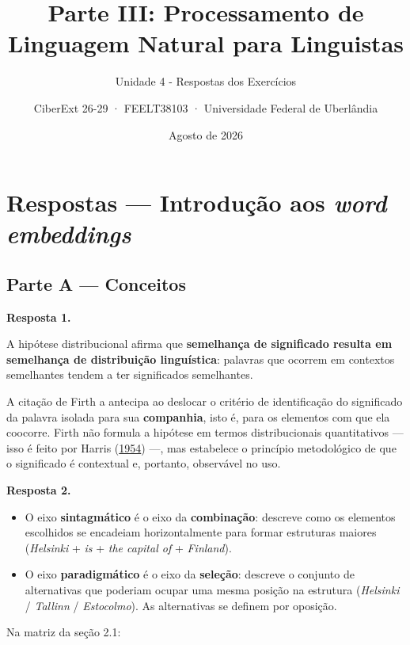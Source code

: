 \documentclass[
  brazilian,
]{article}
\title{Parte III: Processamento de Linguagem Natural para Linguistas}
\subtitle{Unidade 4 - Respostas dos Exercícios}
\author{CiberExt 26-29 · FEELT38103 · Universidade Federal de
Uberlândia}
\date{Agosto de 2026}
\providecommand{\tightlist}{%
  \setlength{\itemsep}{0pt}\setlength{\parskip}{0pt}}
\begin{document}
\maketitle

\hypertarget{respostas-introduuxe7uxe3o-aos-word-embeddings}{%
\section{\texorpdfstring{Respostas --- Introdução aos \emph{word
embeddings}}{Respostas --- Introdução aos word embeddings}}\label{respostas-introduuxe7uxe3o-aos-word-embeddings}}

\hypertarget{parte-a-conceitos}{%
\subsection{Parte A --- Conceitos}\label{parte-a-conceitos}}

\textbf{Resposta 1.}

A hipótese distribucional afirma que \textbf{semelhança de significado
resulta em semelhança de distribuição linguística}: palavras que ocorrem
em contextos semelhantes tendem a ter significados semelhantes.

A citação de Firth a antecipa ao deslocar o critério de identificação do
significado da palavra isolada para sua \textbf{companhia}, isto é, para
os elementos com que ela coocorre. Firth não formula a hipótese em
termos distribucionais quantitativos --- isso é feito por Harris
(\href{https://doi.org/10.1080/00437956.1954.11659520}{1954}) ---, mas
estabelece o princípio metodológico de que o significado é contextual e,
portanto, observável no uso.

\textbf{Resposta 2.}

\begin{itemize}
\tightlist
\item
  O eixo \textbf{sintagmático} é o eixo da \textbf{combinação}: descreve
  como os elementos escolhidos se encadeiam horizontalmente para formar
  estruturas maiores (\emph{Helsinki} + \emph{is} + \emph{the capital
  of} + \emph{Finland}).
\item
  O eixo \textbf{paradigmático} é o eixo da \textbf{seleção}: descreve o
  conjunto de alternativas que poderiam ocupar uma mesma posição na
  estrutura (\emph{Helsinki} / \emph{Tallinn} / \emph{Estocolmo}). As
  alternativas se definem por oposição.
\end{itemize}

Na matriz da seção 2.1:
\end{document}
